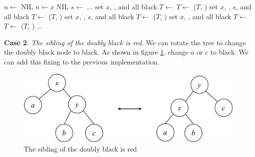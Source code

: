 \documentclass[b5paper]{article}
\begin{document}
\begin{algorithmic}[1]
  \State $n \gets$ NIL
    
    \State $n \gets x$
  \EndIf
   
    \State \Return NIL
  \EndIf
     
        \State $s \gets$ 
        \State ...
            \State set $x$, , and  all black
            \State $T \gets$ 
            \State $T \gets$ ($T$, )
          \Else {}
            \State set $x$, , $s$, and  all black
            \State $T \gets$ ($T$, )
          \EndIf
           
            \State set $x$, , $s$, and  all black
            \State $T \gets$ ($T$, )
          \Else {}
            \State set $x$, , and  all black
            \State $T \gets$ 
            \State $T \gets$ ($T$, )
          \EndIf
        \State ...
        \EndIf
    \EndIf
  \EndWhile
\EndFunction
\end{algorithmic}

\textbf{Case 2}. {\em The sibling of the doubly black is red.} We can rotate the tree to change the doubly black node to black. As shown in figure \cref{fig:del-case2}, change $a$ or $c$ to black. We can add this fixing to the previous implementation.

\begin{figure}[htbp]
  \centering
  \includegraphics[scale=0.4, page=4]{../../../datastruct/tree/red-black-tree/img/rbtree}
  \caption{The sibling of the doubly black is red}
  \label{fig:del-case2}
\end{figure}
\end{document}

